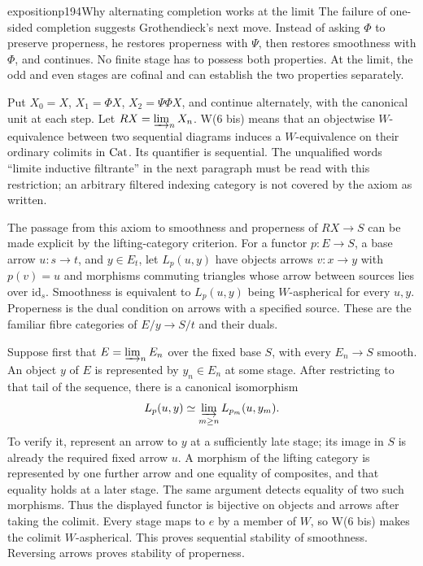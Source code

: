 \begin{dcomment}{exposition}{p194}{Why alternating completion works at the limit}
The failure of one-sided completion suggests Grothendieck's next move. Instead of asking $\Phi$ to preserve properness, he restores properness with $\Psi$, then restores smoothness with $\Phi$, and continues. No finite stage has to possess both properties. At the limit, the odd and even stages are cofinal and can establish the two properties separately.

Put $X_0=X$, $X_1=\Phi X$, $X_2=\Psi\Phi X$, and continue alternately, with the canonical unit at each step. Let $R X=\varinjlim_n X_n$. W(6 bis) means that an objectwise $W$-equivalence between two sequential diagrams induces a $W$-equivalence on their ordinary colimits in $\mathrm{Cat}$. Its quantifier is sequential. The unqualified words ``limite inductive filtrante'' in the next paragraph must be read with this restriction; an arbitrary filtered indexing category is not covered by the axiom as written.

The passage from this axiom to smoothness and properness of $RX\to S$ can be made explicit by the lifting-category criterion. For a functor $p:E\to S$, a base arrow $u:s\to t$, and $y\in E_t$, let $L_p(u,y)$ have objects arrows $v:x\to y$ with $p(v)=u$ and morphisms commuting triangles whose arrow between sources lies over $\mathrm{id}_s$. Smoothness is equivalent to $L_p(u,y)$ being $W$-aspherical for every $u,y$. Properness is the dual condition on arrows with a specified source. These are the familiar fibre categories of $E/y\to S/t$ and their duals.

Suppose first that $E=\varinjlim_n E_n$ over the fixed base $S$, with every $E_n\to S$ smooth. An object $y$ of $E$ is represented by $y_n\in E_n$ at some stage. After restricting to that tail of the sequence, there is a canonical isomorphism
\[
 L_p(u,y)\simeq\varinjlim_{m\ge n}L_{p_m}(u,y_m).
\]
To verify it, represent an arrow to $y$ at a sufficiently late stage; its image in $S$ is already the required fixed arrow $u$. A morphism of the lifting category is represented by one further arrow and one equality of composites, and that equality holds at a later stage. The same argument detects equality of two such morphisms. Thus the displayed functor is bijective on objects and arrows after taking the colimit. Every stage maps to $e$ by a member of $W$, so W(6 bis) makes the colimit $W$-aspherical. This proves sequential stability of smoothness. Reversing arrows proves stability of properness.


\end{dcomment}
